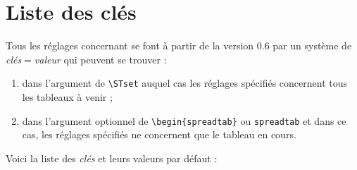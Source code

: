 \documentclass[french,a4paper,10pt]{article}
\newcommand*\ST{\textsf{\STname}\xspace}
\newcommand*\NEW{\marginpar{\vspace{-1.5ex}\itshape\color{red}New v\STver}}
\newcommand*\chevrons[1]{\textlangle\textit{#1}\textrangle}
\begin{document}
\section{Liste des clés}\label{key/val}
Tous les réglages concernant \ST se font à partir de la version 0.6\NEW{} par un système de \chevrons{clés}$=$\chevrons{valeur} qui peuvent se trouver :
\begin{enumerate}
	\item dans l'argument de \verb|\STset| auquel cas les réglages spécifiés concernent tous les tableaux à venir ;
	\item dans l'argument optionnel de \verb|\begin{spreadtab}| ou \verb|spreadtab| et dans ce cas, les réglages spécifiés ne concernent que le tableau en cours.
\end{enumerate}
Voici la liste des \chevrons{clés} et leurs valeurs par défaut :\renewcommand\arraystretch{1.33}%
\end{document}
